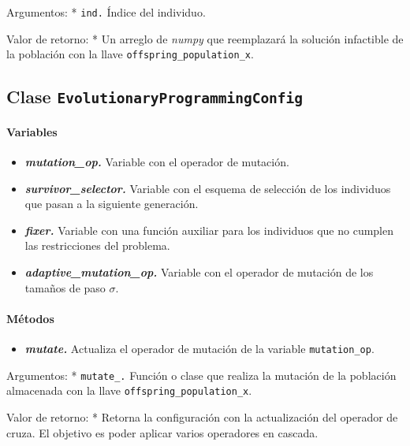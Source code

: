\documentclass[11pt]{article}
\providecommand{\tightlist}{%
      \setlength{\itemsep}{0pt}\setlength{\parskip}{0pt}}
\begin{document}
Argumentos: * \texttt{ind.} Índice del individuo.

Valor de retorno: * Un arreglo de \emph{numpy} que reemplazará la
solución infactible de la población con la llave
\texttt{offspring\_population\_x}.

    \subsection{\texorpdfstring{Clase
\texttt{EvolutionaryProgrammingConfig}}{Clase EvolutionaryProgrammingConfig}}\label{clase-evolutionaryprogrammingconfig}

    \paragraph{Variables}\label{variables}

\begin{itemize}
\tightlist
\item
  \emph{\textbf{mutation\_op.}} Variable con el operador de mutación.
\item
  \emph{\textbf{survivor\_selector.}} Variable con el esquema de
  selección de los individuos que pasan a la siguiente generación.
\item
  \emph{\textbf{fixer.}} Variable con una función auxiliar para los
  individuos que no cumplen las restricciones del problema.
\item
  \emph{\textbf{adaptive\_mutation\_op.}} Variable con el operador de
  mutación de los tamaños de paso \(\sigma\).
\end{itemize}

\paragraph{Métodos}\label{muxe9todos}

\begin{itemize}
\tightlist
\item
  \emph{\textbf{mutate.}} Actualiza el operador de mutación de la
  variable \texttt{mutation\_op}.
\end{itemize}

Argumentos: * \texttt{mutate\_.} Función o clase que realiza la mutación
de la población almacenada con la llave
\texttt{offspring\_population\_x}.

Valor de retorno: * Retorna la configuración con la actualización del
operador de cruza. El objetivo es poder aplicar varios operadores en
cascada.
\end{document}
